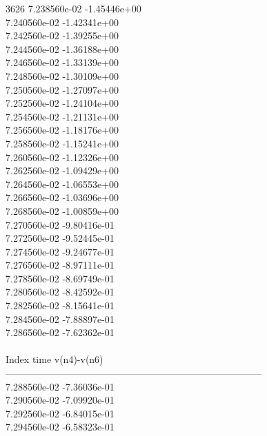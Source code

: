 3626	7.238560e-02	-1.45446e+00	\\ 	7.240560e-02	-1.42341e+00	\\ 	7.242560e-02	-1.39255e+00	\\ 	7.244560e-02	-1.36188e+00	\\ 	7.246560e-02	-1.33139e+00	\\ 	7.248560e-02	-1.30109e+00	\\ 	7.250560e-02	-1.27097e+00	\\ 	7.252560e-02	-1.24104e+00	\\ 	7.254560e-02	-1.21131e+00	\\ 	7.256560e-02	-1.18176e+00	\\ 	7.258560e-02	-1.15241e+00	\\ 	7.260560e-02	-1.12326e+00	\\ 	7.262560e-02	-1.09429e+00	\\ 	7.264560e-02	-1.06553e+00	\\ 	7.266560e-02	-1.03696e+00	\\ 	7.268560e-02	-1.00859e+00	\\ 	7.270560e-02	-9.80416e-01	\\ 	7.272560e-02	-9.52445e-01	\\ 	7.274560e-02	-9.24677e-01	\\ 	7.276560e-02	-8.97111e-01	\\ 	7.278560e-02	-8.69749e-01	\\ 	7.280560e-02	-8.42592e-01	\\ 	7.282560e-02	-8.15641e-01	\\ 	7.284560e-02	-7.88897e-01	\\ 	7.286560e-02	-7.62362e-01	\\ \hline
\\ \hline
Index   time            v(n4)-v(n6)     \\ \hline
--------------------------------------------------------------------------------\\ 	7.288560e-02	-7.36036e-01	\\ 	7.290560e-02	-7.09920e-01	\\ 	7.292560e-02	-6.84015e-01	\\ 	7.294560e-02	-6.58323e-01	\\ \hline
